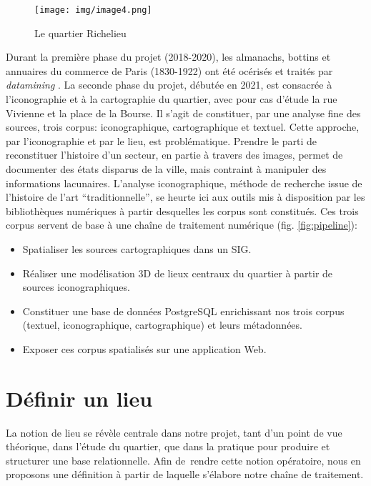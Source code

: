 \documentclass[11pt,french]{article}
\begin{document}
\begin{figure}[h!]
	\centering
	\texttt{[image: img/image4.png]}
	\caption{Le quartier Richelieu}
	\label{fig:quartier}
\end{figure}

Durant la première phase du projet (2018-2020), les almanachs, bottins et annuaires du commerce de Paris (1830-1922) ont été océrisés et traités par \textit{datamining} \citep{di_leonardo_repopulating_2019}. La seconde phase du projet, débutée en 2021, est consacrée à l’iconographie et à la cartographie du quartier, avec pour cas d’étude la rue Vivienne et la place de la Bourse. Il s’agit de constituer, par une analyse fine des sources, trois corpus: iconographique, cartographique et textuel. Cette approche, par l’iconographie et par le lieu, est problématique. Prendre le parti de reconstituer l’histoire d’un secteur, en partie à travers des images, permet de documenter des états disparus de la ville, mais contraint à manipuler des informations lacunaires. L’analyse iconographique, méthode de recherche issue de l’histoire de l’art \enquote{traditionnelle}, se heurte ici aux outils mis à disposition par les bibliothèques numériques à partir desquelles les corpus sont constitués. Ces trois corpus servent de base à une chaîne de traitement numérique (fig. \ref{fig:pipeline}):

\begin{itemize}
	\item Spatialiser les sources cartographiques dans un SIG.
	\item Réaliser une modélisation 3D de lieux centraux du quartier à partir de sources iconographiques.
	\item Constituer une base de données PostgreSQL enrichissant nos trois corpus (textuel, iconographique, cartographique) et leurs métadonnées.
	\item Exposer ces corpus spatialisés sur une application Web.
\end{itemize}

\section{Définir un lieu}
\label{sec:II}
La notion de lieu se révèle centrale dans notre projet, tant d’un point de vue théorique, dans l’étude du quartier, que dans la pratique pour produire et structurer une base relationnelle. Afin de rendre cette notion opératoire, nous en proposons une définition à partir de laquelle s’élabore notre chaîne de traitement.
\end{document}
